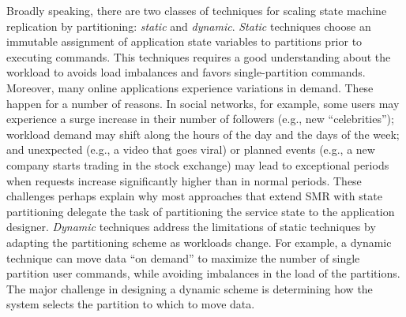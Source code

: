 Broadly speaking, there are two classes of techniques for scaling state machine
replication by partitioning: \emph{static} and \emph{dynamic}.
\emph{Static} techniques choose an immutable assignment of application state
variables to partitions prior to executing commands. This techniques requires a
good understanding about the workload to avoids load imbalances and favors
single-partition commands. Moreover, many online applications experience
variations in demand. These happen for a number of reasons. In social networks,
for example, some users may experience a surge increase in their number of
followers (e.g., new ``celebrities''); workload demand may shift along the hours
of the day and the days of the week; and unexpected (e.g., a video that goes
viral) or planned events (e.g., a new company starts trading in the stock
exchange) may lead to exceptional periods when requests increase significantly
higher than in normal periods. These challenges perhaps explain why most
approaches that extend SMR with state partitioning delegate the task of
partitioning the service state to the application designer. \emph{Dynamic}
techniques address the limitations of static techniques by adapting the
partitioning scheme as workloads change. For example, a dynamic technique can
move data ``on demand'' to maximize the number of single partition user
commands, while avoiding imbalances in the load of the partitions. The major
challenge in designing a dynamic scheme is determining how the system selects
the partition to which to move data.


